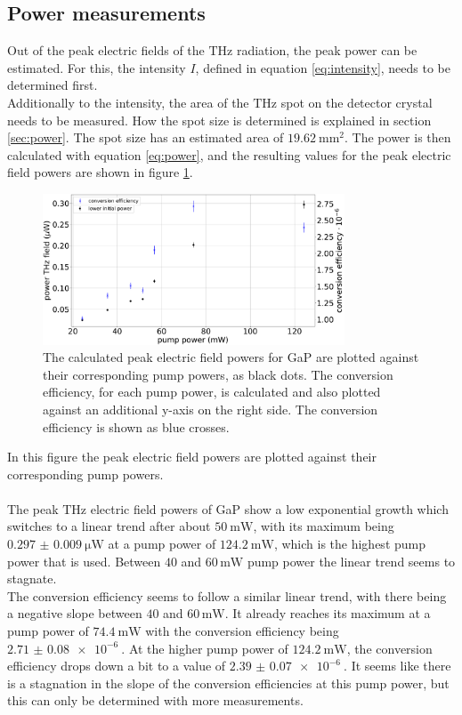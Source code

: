 \subsection{Power measurements}
Out of the peak electric fields of the $\si{\tera\hertz}$ radiation, the peak power can be estimated.
For this, the intensity $I$, defined in equation \eqref{eq:intensity}, needs to be determined first.
\\
Additionally to the intensity, the area of the $\si{\tera\hertz}$ spot on the detector crystal needs to be measured.
How the spot size is determined is explained in section \ref{sec:power}.
The spot size has an estimated area of $\SI{19.62}{\milli\meter\squared}$.
The power is then calculated with equation \eqref{eq:power}, and the resulting values for the peak electric field powers are shown in figure \ref{fig:gap_power}.\FloatBarrier
\begin{figure}
    \centering
    \includegraphics[width=0.8\textwidth]{Plots/Powergap.pdf}
    \caption{The calculated peak electric field powers for GaP are plotted against their corresponding pump powers, as black dots.
    The conversion efficiency, for each pump power, is calculated and also plotted against an additional y-axis on the right side.
    The conversion efficiency is shown as blue crosses.}
    \label{fig:gap_power}\FloatBarrier
\end{figure}
In this figure the peak electric field powers are plotted against their corresponding pump powers.
\\\\
The peak $\si{\tera\hertz}$ electric field powers of GaP show a low exponential growth which switches to a linear trend after about $\SI{50}{\milli\W}$, with its maximum being $\SI{0.297(9)}{\micro\W}$ at a pump power of $\SI{124.2}{\milli\W}$, which is the highest pump power that is used.
Between $40$ and $60 \, \si{\milli\W}$ pump power the linear trend seems to stagnate.
\\
The conversion efficiency seems to follow a similar linear trend, with there being a negative slope between  $40$ and $60 \, \si{\milli\W}$.
It already reaches its maximum at a pump power of $\SI{74.4}{\milli\W}$ with the conversion efficiency being $\SI{2.71(8)e-6}{}$.
At the higher pump power of $\SI{124.2}{\milli\W}$, the conversion efficiency drops down a bit to a value of $\SI{2.39(7)e-6}{}$.
It seems like there is a stagnation in the slope of the conversion efficiencies at this pump power, but this can only be determined with more measurements.
\FloatBarrier
